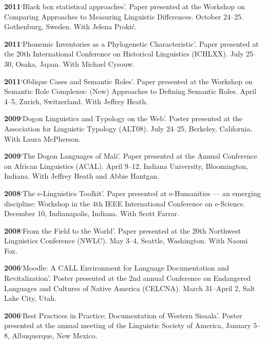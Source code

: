 \documentclass[11pt]{article}
\newcommand{\hangpara}{
 \setlength{\parindent}{0in} %
 \hangindent=0.42in %
}
\begin{document}
\vskip 6pt
\hangpara
{\bf 2011}\hspace{1ex}`Black box statistical approaches'. Paper presented at the Workshop on Comparing Approaches to Measuring Linguistic Differences. October 24--25. Gothenburg, Sweden. With Jelena Proki{\'c}.

\vskip 6pt
\hangpara
{\bf 2011}\hspace{1ex}`Phonemic Inventories as a Phylogenetic Characteristic'. Paper presented at the 20th International Conference on Historical Linguistics (ICHLXX). July 25--30, Osaka, Japan. With Michael Cysouw.

\vskip 6pt
\hangpara
{\bf 2011}\hspace{1ex}`Oblique Cases and Semantic Roles'. Paper presented at the Workshop on Semantic Role Complexes: (New) Approaches to Defining Semantic Roles. April 4--5, Zurich, Switzerland. With Jeffrey Heath.

\vskip 6pt
\hangpara
{\bf 2009}\hspace{1ex}`Dogon Linguistics and Typology on the Web'. Poster presented at the Association for Linguistic Typology (ALT08). July 24--25, Berkeley, California. With Laura McPherson.

\vskip 6pt
\hangpara
{\bf 2009}\hspace{1ex}`The Dogon Languages of Mali'. Paper presented at the Annual Conference on African Linguistics (ACAL). April 9--12, Indiana University, Bloomington, Indiana. With Jeffrey Heath and Abbie Hantgan.

\vskip 6pt
\hangpara
{\bf 2008}\hspace{1ex}`The e-Linguistics Toolkit'. Paper presented at e-Humanities --- an emerging discipline: Workshop in the 4th IEEE International Conference on e-Science. December 10, Indianapolis, Indiana. With Scott Farrar.

\vskip 6pt
\hangpara
{\bf 2008}\hspace{1ex}`From the Field to the World'. Paper presented at the 20th Northwest Linguistics Conference (NWLC). May 3--4, Seattle, Washington. With Naomi Fox.

\vskip 6pt
\hangpara
{\bf 2006}\hspace{1ex}`Moodle: A CALL Environment for Language Documentation and Revitalization'. Poster presented at the 2nd annual Conference on Endangered Languages and Cultures of Native America (CELCNA). March 31--April 2, Salt Lake City, Utah.

\vskip 6pt
\hangpara
{\bf 2006}\hspace{1ex}`Best Practices in Practice: Documentation of Western Sisaala'. Poster presented at the annual meeting of the Linguistic Society of America, January 5--8, Albuquerque, New Mexico.
\end{document}
